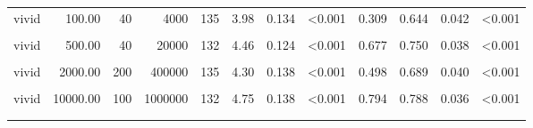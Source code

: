 \documentclass[
]{article}
\begin{document}
\begin{longtable}[t]{lrrrrrrlrrrl}
\hspace{1em}vivid & 100.00 & 40 & 4000 & 135 & 3.98 & 0.134 & <0.001 & 0.309 & 0.644 & 0.042 & <0.001\\
\hspace{1em}\cellcolor{gray!10}{vivid} & \cellcolor{gray!10}{500.00} & \cellcolor{gray!10}{10} & \cellcolor{gray!10}{5000} & \cellcolor{gray!10}{135} & \cellcolor{gray!10}{4.33} & \cellcolor{gray!10}{0.135} & \cellcolor{gray!10}{<0.001} & \cellcolor{gray!10}{0.528} & \cellcolor{gray!10}{0.756} & \cellcolor{gray!10}{0.037} & \cellcolor{gray!10}{<0.001}\\
\hspace{1em}vivid & 500.00 & 40 & 20000 & 132 & 4.46 & 0.124 & <0.001 & 0.677 & 0.750 & 0.038 & <0.001\\
\hspace{1em}\cellcolor{gray!10}{vivid} & \cellcolor{gray!10}{2000.00} & \cellcolor{gray!10}{20} & \cellcolor{gray!10}{40000} & \cellcolor{gray!10}{132} & \cellcolor{gray!10}{4.71} & \cellcolor{gray!10}{0.122} & \cellcolor{gray!10}{<0.001} & \cellcolor{gray!10}{0.866} & \cellcolor{gray!10}{0.833} & \cellcolor{gray!10}{0.033} & \cellcolor{gray!10}{<0.001}\\
\hspace{1em}vivid & 2000.00 & 200 & 400000 & 135 & 4.30 & 0.138 & <0.001 & 0.498 & 0.689 & 0.040 & <0.001\\
\hspace{1em}\cellcolor{gray!10}{vivid} & \cellcolor{gray!10}{10000.00} & \cellcolor{gray!10}{30} & \cellcolor{gray!10}{300000} & \cellcolor{gray!10}{135} & \cellcolor{gray!10}{4.56} & \cellcolor{gray!10}{0.137} & \cellcolor{gray!10}{<0.001} & \cellcolor{gray!10}{0.663} & \cellcolor{gray!10}{0.741} & \cellcolor{gray!10}{0.038} & \cellcolor{gray!10}{<0.001}\\
\hspace{1em}vivid & 10000.00 & 100 & 1000000 & 132 & 4.75 & 0.138 & <0.001 & 0.794 & 0.788 & 0.036 & <0.001\\
\addlinespace[0.3em]
\multicolumn{12}{l}{\textbf{Exp. 6 (filtered)}}\\
\hspace{1em}\cellcolor{gray!10}{neutral} & \cellcolor{gray!10}{1.33} & \cellcolor{gray!10}{30} & \cellcolor{gray!10}{40} & \cellcolor{gray!10}{58} & \cellcolor{gray!10}{2.52} & \cellcolor{gray!10}{0.169} & \cellcolor{gray!10}{<0.001} & \cellcolor{gray!10}{-0.772} & \cellcolor{gray!10}{0.207} & \cellcolor{gray!10}{0.054} & \cellcolor{gray!10}{<0.001}\\

\end{longtable}
\end{document}
